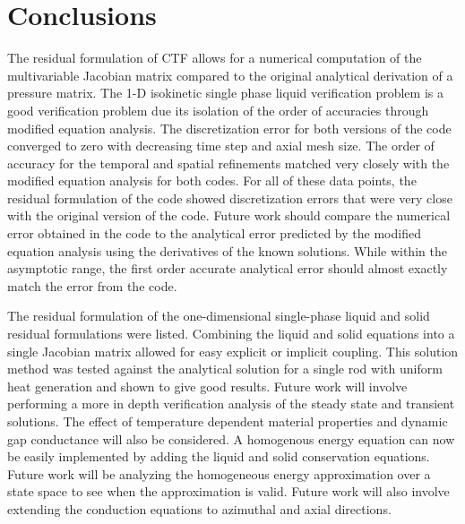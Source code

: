 \vspace*{-80mm}
\chapter{Conclusions} \label{chapter7:uniform_heating}
 

The residual formulation of CTF allows for a numerical computation of the
multivariable Jacobian matrix compared to the original analytical derivation of
a pressure matrix. The 1-D isokinetic single phase liquid verification problem
is a good verification problem due its isolation of the order of accuracies
through modified equation analysis. The discretization error for both versions
of the code converged to zero with decreasing time step and axial mesh size.
The order of accuracy for the temporal and spatial refinements matched very
closely with the modified equation analysis for both codes. For all of these
data points, the residual formulation of the code showed discretization errors
that were very close with the original version of the code. Future work should
compare the numerical error obtained in the code to the analytical error
predicted by the modified equation analysis using the derivatives of the known
solutions. While within the asymptotic range, the first order accurate
analytical error should almost exactly match the error from the code.

The residual formulation of the one-dimensional single-phase liquid and solid
residual formulations were listed. Combining the liquid and solid equations into
a single Jacobian matrix allowed for easy explicit or implicit coupling. This
solution method was tested against the analytical solution for a single rod with
uniform heat generation and shown to give good results. Future work will involve
performing a more in depth verification analysis of the steady state and
transient solutions. The effect of temperature dependent material properties
and dynamic gap conductance will also be considered. A homogenous energy
equation can now be easily implemented by adding the liquid and solid
conservation equations. Future work will be analyzing the homogeneous energy
approximation over a state space to see when the approximation is valid. Future
work will also involve extending the conduction equations to azimuthal and axial
directions.








